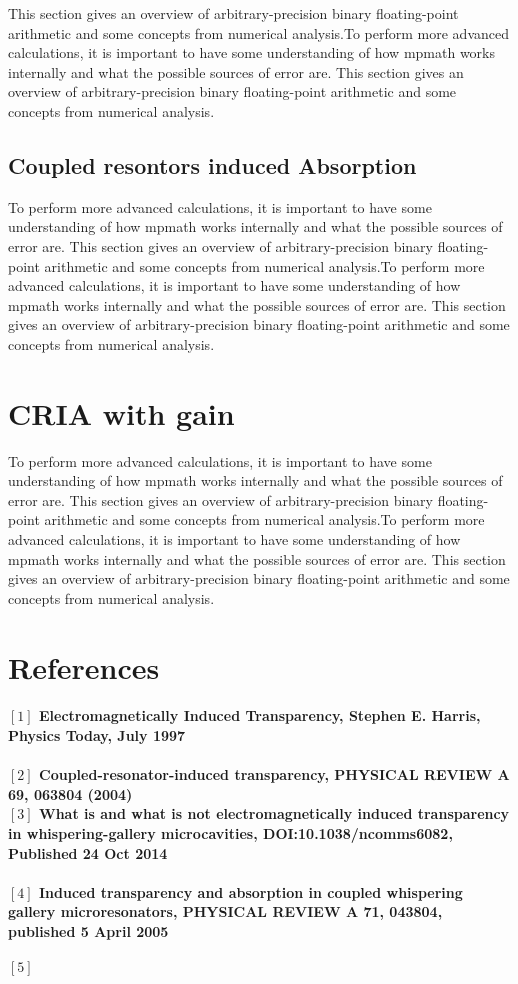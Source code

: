   This section gives an overview of arbitrary-precision binary floating-point arithmetic and some concepts from numerical analysis.To perform more advanced calculations, it is important to have some understanding of how mpmath works internally and what the possible sources of error are. This section gives an overview of arbitrary-precision binary floating-point arithmetic and some concepts from numerical analysis.
  
\subsection{Coupled resontors induced Absorption}

To perform more advanced calculations, it is important to have some understanding of how mpmath works internally and what the possible sources of error are. This section gives an overview of arbitrary-precision binary floating-point arithmetic and some concepts from numerical analysis.To perform more advanced calculations, it is important to have some understanding of how mpmath works internally and what the possible sources of error are. This section gives an overview of arbitrary-precision binary floating-point arithmetic and some concepts from numerical analysis.
\section{CRIA with gain}
To perform more advanced calculations, it is important to have some understanding of how mpmath works internally and what the possible sources of error are. This section gives an overview of arbitrary-precision binary floating-point arithmetic and some concepts from numerical analysis.To perform more advanced calculations, it is important to have some understanding of how mpmath works internally and what the possible sources of error are. This section gives an overview of arbitrary-precision binary floating-point arithmetic and some concepts from numerical analysis.


\newpage
\section*{References}

\paragraph{\normalfont \large $[1]$ Electromagnetically Induced Transparency, Stephen E. Harris, Physics Today, July 1997 \\ 
\\$[2]$ Coupled-resonator-induced transparency, PHYSICAL REVIEW A 69, 063804 (2004)
\\$[3]$ What is and what is not electromagnetically induced transparency in whispering-gallery microcavities, DOI:10.1038/ncomms6082, Published 24 Oct 2014 \\
\\$[4]$  Induced transparency and absorption in coupled whispering gallery microresonators, PHYSICAL REVIEW A 71, 043804, published 5 April 2005\\
\\$[5]$  }